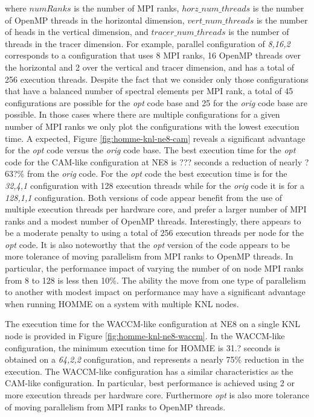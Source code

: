 where $numRanks$ is the number of MPI ranks, $horz\_num\_threads$ is the number of OpenMP threads in the horizontal dimension, $vert\_num\_threads$ is the number of heads in the vertical dimension, and $tracer\_num\_threads$ is the number of threads in the tracer dimension.  For example,  parallel configuration of {\em 8,16,2} corresponds to a configuration that uses 8 MPI ranks, 16 OpenMP threads over the horizontal and 2 over the vertical and tracer dimension, and has a total of 256 execution threads.   Despite the fact that we consider only those configurations that have a balanced number of spectral elements per MPI rank,  a total of 45 configurations are possible for the {\em opt} code base and 25 for the {\em orig} code base are possible.  In those cases where there are multiple configurations for a given number of MPI ranks we only plot the configurations with the lowest execution time.  A expected, Figure \ref{fig:homme-knl-ne8-cam} reveals a significant advantage for the {\em opt} code versus the {\em orig} code base.  The best execution time for the {\em opt} code for the CAM-like configuration at NE8 is ??? seconds a reduction of nearly ?63?\% from the {\em orig} code.  For the {\em opt} code the best execution time is for the {\em 32,4,1} configuration with 128 execution threads while for the {\em orig} code it is for a {\em 128,1,1} configuration.  Both versions of code appear benefit from the use of multiple execution threads per hardware core, and prefer a larger number of MPI ranks and a modest number of OpenMP threads.  Interestingly, there appears to be a moderate penalty to using a total of 256 execution threads per node for the {\em opt} code.  It is also noteworthy that the {\em opt} version of the code appears to be more tolerance of moving parallelism from MPI ranks to OpenMP threads.  In particular, the performance impact of varying the number of on node MPI ranks from 8 to 128 is less then 10\%.  The ability the move from one type of parallelism to another with modest impact on performance may have a significant advantage when running HOMME on a system with multiple KNL nodes.  

The execution time for the WACCM-like configuration at NE8 on a single KNL node is provided in Figure \ref{fig:homme-knl-ne8-waccm}.  In the WACCM-like configuration, the minimum execution time for HOMME is 31.? seconds is obtained on a {\em 64,2,2} configuration, and represents a nearly 75\% reduction in the execution. The WACCM-like configuration has a similar characteristics as the CAM-like configuration. In particular, best performance is achieved using 2 or more execution threads per hardware core.  Furthermore {\em opt} is also more tolerance of moving parallelism from MPI ranks to OpenMP threads.  

